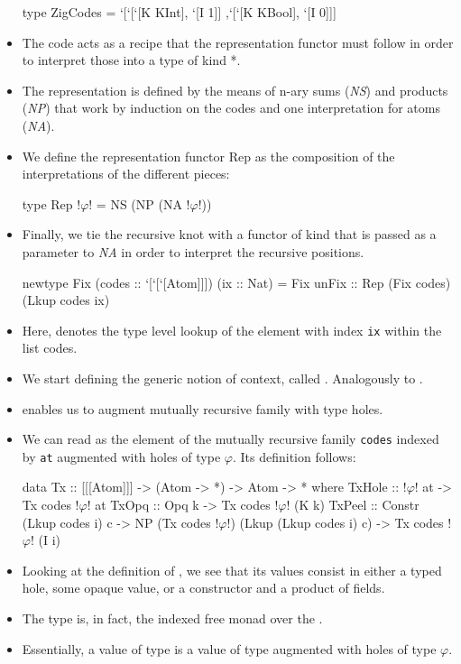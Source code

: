 \begin{itemize}
\begin{haskell}
        type ZigCodes = `[`[`[K KInt],  `[I 1]]
                         ,`[`[K KBool], `[I 0]]]
    \end{haskell}
    \item The code acts as a recipe that the representation functor must follow in order to interpret those into a type of kind *.
    \item The representation is defined by the means of n-ary sums (\textit{NS}) and products (\textit{NP}) that work by induction on the codes and one interpretation for atoms (\textit{NA}).
    \item We define the representation functor Rep as the composition of the interpretations of the different pieces:
    \begin{haskell}
        type Rep !$\varphi$! = NS (NP (NA !$\varphi$!))
    \end{haskell}
    \item Finally, we tie the recursive knot with a functor of kind  that is passed as a parameter to \textit{NA} in order to interpret the recursive positions.
    \begin{haskell}
        newtype Fix (codes :: `[`[`[Atom]]]) (ix :: Nat)
            = Fix { unFix :: Rep (Fix codes) (Lkup codes ix) }
    \end{haskell}
    \item Here,  denotes the type level lookup of the element with index \texttt{ix} within the list codes.
    \item We start defining the generic notion of context, called . Analogously to .
    \item {} enables us to augment mutually recursive family with type holes.
    \item We can read  as the element of the mutually recursive family \texttt{codes} indexed by \texttt{at} augmented with holes of type $\varphi$. Its definition follows:
    \begin{haskell}
        data Tx :: [[[Atom]]] -> (Atom -> *) -> Atom -> * where
            TxHole :: !$\varphi$! at -> Tx codes !$\varphi$! at
            TxOpq  :: Opq k -> Tx codes !$\varphi$! (K k)
            TxPeel :: Constr (Lkup codes i) c
                   -> NP (Tx codes !$\varphi$!) (Lkup (Lkup codes i) c)
                   -> Tx codes !$\varphi$! (I i) 
    \end{haskell}
    \item Looking at the definition of , we see that its values consist in either a typed hole, some opaque value, or a constructor and a product of fields.
    \item The  type is, in fact, the indexed free monad over the .
    \item Essentially, a value of type  is a value of type  augmented with holes of type $\varphi$.
\end{itemize}    

